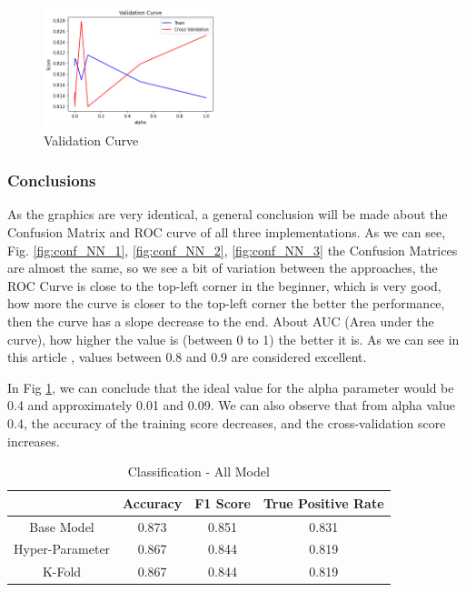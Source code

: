 \documentclass[conference]{IEEEtran}
\begin{document}
\begin{figure}[h!]
    \centering
    \includegraphics[width=5cm]{NN/nn3_3.png}
    \caption{Validation Curve}
    \label{img:validationCurve_NN}
\end{figure}

\subsubsection{Conclusions}
As the graphics are very identical, a general conclusion will be made about the Confusion Matrix and ROC curve of all three implementations. As we can see, Fig. \ref{fig:conf_NN_1}, \ref{fig:conf_NN_2}, \ref{fig:conf_NN_3} the Confusion Matrices are almost the same, so we see a bit of variation between the approaches, the ROC Curve is close to the top-left corner in the beginner, which is very good, how more the curve is closer to the top-left corner the better the performance, then the curve has a slope decrease to the end. About AUC (Area under the curve), how higher the value is (between 0 to 1) the better it is. As we can see in this article \cite{ROC_article}, values between 0.8 and 0.9 are considered excellent.

In Fig \ref{img:validationCurve_NN}, we can conclude that the ideal value for the alpha parameter would be 0.4 and approximately 0.01 and 0.09. We can also observe that from alpha value 0.4, the accuracy of the training score decreases, and the cross-validation score increases.

\begin{table}[ht!]
    \centering
    \caption{Classification - All Model} 
    \begin{tabular}{||c| c c c||} 
     \hline
     & Accuracy & F1 Score & True Positive Rate \\ [0.5ex] 
     \hline\hline
     Base Model &0.873 & 0.851 & 0.831 \\
     \hline
    Hyper-Parameter & 0.867 & 0.844 & 0.819 \\ 
    \hline
    K-Fold & 0.867 & 0.844 & 0.819 \\ 
    \hline
    \end{tabular}
    \label{tab:tab3}
\end{table}
\end{document}
